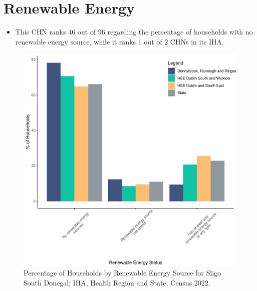 \documentclass{article}
\begin{document}
\section{Renewable Energy}\label{sect:RE}
\begin{itemize}
\item This CHN ranks  46 out of 96 regarding the percentage of households with no renewable energy source, while it ranks   1 out of 2 CHNs in its IHA.
\end{itemize}
\begin{figure}[H]
	\centering
	\includegraphics[width = 140mm]{../figures/RenewableEnergyED.pdf}
	\caption{Percentage of Households by Renewable Energy Source for Sligo South Donegal; IHA, Health Region and State; Census 2022.}
	\label{fig:vbnv}
	\end{figure}
\end{document}
